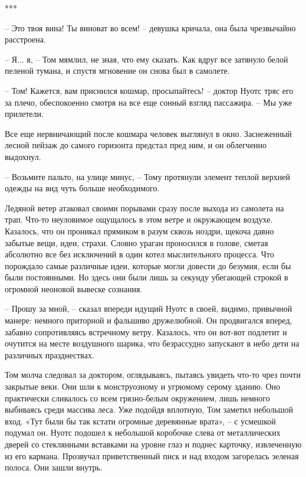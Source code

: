 \begin{center}***\end{center}

– Это твоя вина! Ты виноват во всем! – девушка кричала, она была чрезвычайно расстроена.

– Я... я, – Том мямлил, не зная, что ему сказать. Как вдруг все затянуло белой пеленой тумана, и спустя мгновение он снова был в самолете.

– Том! Кажется, вам приснился кошмар, просыпайтесь! – доктор Нуотс тряс его за плечо, обеспокоенно смотря на все еще сонный взгляд пассажира.  – Мы уже прилетели.

Все еще нервничающий после кошмара человек выглянул в окно. Заснеженный лесной пейзаж до самого горизонта предстал пред ним, и он облегченно выдохнул. 

– Возьмите пальто, на улице минус, – Тому протянули элемент теплой верхней одежды на вид чуть больше необходимого. 

Ледяной ветер атаковал своими порывами сразу после выхода из самолета на трап. Что-то неуловимое ощущалось в этом ветре и окружающем воздухе. Казалось, что он проникал прямиком в разум сквозь ноздри, щекоча давно забытые вещи, идеи, страхи. Словно ураган проносился в голове, сметая абсолютно все без исключений в один котел мыслительного процесса. Что порождало самые различные идеи, которые могли довести до безумия, если бы были постоянными. Но здесь они были лишь за секунду убегающей строкой в огромной неоновой вывеске сознания. 

– Прошу за мной, – сказал впереди идущий Нуотс в своей, видимо, привычной манере: немного приторной и фальшиво дружелюбной. Он продвигался вперед, забавно сопротивляясь встречному ветру. Казалось, что он вот-вот подлетит и очутится на месте воздушного шарика, что безрассудно запускают в небо дети на различных празднествах. 

Том молча следовал за доктором, оглядываясь, пытаясь увидеть что-то чрез почти закрытые веки. Они шли к монструозному и угрюмому серому зданию. Оно практически сливалось со всем грязно-белым окружением, лишь немного выбиваясь среди массива леса. Уже подойдя вплотную, Том заметил небольшой вход. «Тут были бы так кстати огромные деревянные врата», – с усмешкой подумал он. Нуотс подошел к небольшой коробочке слева от металлических дверей со стеклянными вставками на уровне глаз и поднес карточку, извлеченную из его кармана. Прозвучал приветственный писк и над входом загорелась зеленая полоса. Они зашли внутрь. 

